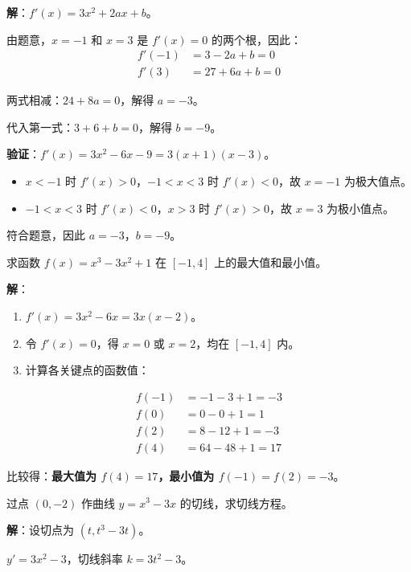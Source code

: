\documentclass[12pt, a4paper]{ctexart}
\begin{document}
\textbf{解}：$f'(x) = 3x^2 + 2ax + b$。

由题意，$x = -1$ 和 $x = 3$ 是 $f'(x) = 0$ 的两个根，因此：
\begin{align*}
f'(-1) &= 3 - 2a + b = 0 \\
f'(3) &= 27 + 6a + b = 0
\end{align*}

两式相减：$24 + 8a = 0$，解得 $a = -3$。

代入第一式：$3 + 6 + b = 0$，解得 $b = -9$。

\textbf{验证}：$f'(x) = 3x^2 - 6x - 9 = 3(x+1)(x-3)$。
\begin{itemize}[leftmargin=2em]
  \item $x < -1$ 时 $f'(x) > 0$，$-1 < x < 3$ 时 $f'(x) < 0$，故 $x = -1$ 为极大值点。
  \item $-1 < x < 3$ 时 $f'(x) < 0$，$x > 3$ 时 $f'(x) > 0$，故 $x = 3$ 为极小值点。
\end{itemize}
符合题意，因此 $a = -3$，$b = -9$。

\begin{examplebox}[【例题7】闭区间上求最值]
求函数 $f(x) = x^3 - 3x^2 + 1$ 在 $[-1, 4]$ 上的最大值和最小值。
\end{examplebox}

\textbf{解}：
\begin{enumerate}[leftmargin=2em]
  \item $f'(x) = 3x^2 - 6x = 3x(x - 2)$。
  \item 令 $f'(x) = 0$，得 $x = 0$ 或 $x = 2$，均在 $[-1, 4]$ 内。
  \item 计算各关键点的函数值：
\end{enumerate}
\begin{align*}
f(-1) &= -1 - 3 + 1 = -3 \\
f(0) &= 0 - 0 + 1 = 1 \\
f(2) &= 8 - 12 + 1 = -3 \\
f(4) &= 64 - 48 + 1 = 17
\end{align*}

比较得：\textbf{最大值为 $f(4) = 17$，最小值为 $f(-1) = f(2) = -3$}。

\begin{examplebox}[【例题8】过曲线外一点的切线方程]
过点 $(0, -2)$ 作曲线 $y = x^3 - 3x$ 的切线，求切线方程。
\end{examplebox}

\textbf{解}：设切点为 $(t, t^3 - 3t)$。

$y' = 3x^2 - 3$，切线斜率 $k = 3t^2 - 3$。
\end{document}
